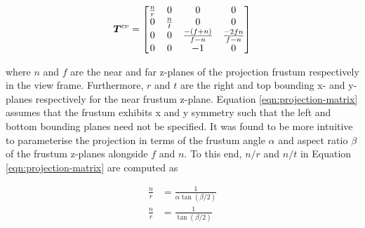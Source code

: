 \begin{equation}
	\bm{T}^{cv}=
	\begin{bmatrix}
		\frac{n}{r} & 0 & 0 & 0 \\
		0 & \frac{n}{t} & 0 & 0 \\
		0 & 0 & \frac{-(f+n)}{f-n} & \frac{-2fn}{f-n} \\
		0 & 0 & -1 & 0
	\end{bmatrix}
\label{eqn:projection-matrix}
\end{equation}

where $n$ and $f$ are the near and far z-planes of the projection frustum respectively in the view frame. Furthermore, $r$ and $t$ are the right and top bounding x- and y-planes respectively for the near frustum z-plane. Equation \ref{eqn:projection-matrix} assumes that the frustum exhibits x and y symmetry such that the left and bottom bounding planes need not be specified. It was found to be more intuitive to parameterise the projection in terms of the frustum angle $\alpha$ and aspect ratio $\beta$ of the frustum z-planes alongside $f$ and $n$. To this end, $n/r$ and $n/t$ in Equation \ref{eqn:projection-matrix} are computed as

\begin{align}
	\frac{n}{r}&=\frac{1}{\alpha\tan(\beta/2)}\\
	\frac{n}{r}&=\frac{1}{\tan(\beta/2)}
\end{align} 

